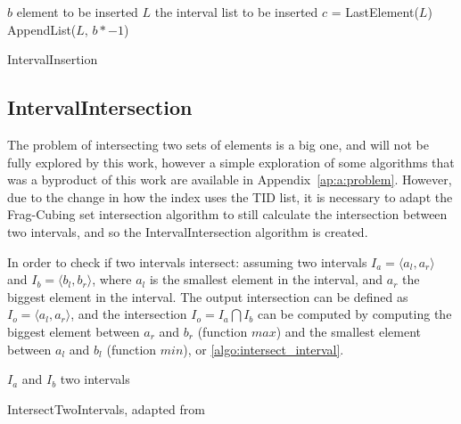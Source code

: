 \begin{algorithm}[!htb]
\SetAlgoLined
{}
 $b$ element to be inserted\;
 $L$ the interval list to be inserted\;
 $c$ = LastElement($L$)\;
 AppendList($L$, $b * - 1$) 
 \caption{IntervalInsertion}\label{algo:interval_insertion}
\end{algorithm}

\subsection{IntervalIntersection}\label{ch:interval:algo:intersection}

The problem of intersecting two sets of elements is a big one, and will not be fully explored by this work, however a simple exploration of some algorithms that was a byproduct of this work are available in Appendix~\ref{ap:a:problem}.
However, due to the change in how the index uses the TID list, it is necessary to adapt the Frag-Cubing set intersection algorithm to still calculate the intersection between two intervals, and so the IntervalIntersection algorithm is created.

In order to check if two intervals intersect: assuming two intervals $I_a = \langle a_l, a_r \rangle$ and $I_b = \langle b_l, b_r \rangle$, where $a_l$ is the smallest element in the interval, and $a_r$ the biggest element in the interval.
The output intersection can be defined as $I_o = \langle a_l, a_r \rangle$, and the intersection $I_o = I_a \bigcap I_b$ can be computed by computing the biggest element between $a_r$ and $b_r$ (function $max$) and the smallest element between $a_l$ and $b_l$ (function $min$), or \autoref{algo:intersect_interval}.

\begin{algorithm}[!htb]
\SetAlgoLined
{}
 $I_a$ and $I_b$ two intervals\;
  \caption{IntersectTwoIntervals, adapted from \cite{26260}}\label{algo:intersect_interval}
\end{algorithm}

